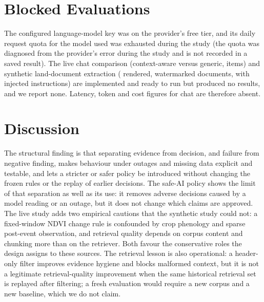\documentclass[journal]{IEEEtran}
\begin{document}
\section{Blocked Evaluations}\label{sec:blocked}
The configured language-model key was on the provider's free tier, and its daily request quota for the model used was exhausted during the study (the quota was diagnosed from the provider's error during the study and is not recorded in a saved result). The live chat comparison (context-aware versus generic, \ChatLiveItems{} items) and synthetic land-document extraction (\LandDocsSynthetic{} rendered, watermarked documents, \LandDocsInjected{} with injected instructions) are implemented and ready to run but produced no results, and we report none. Latency, token and cost figures for chat are therefore absent.

\section{Discussion}
The structural finding is that separating evidence from decision, and failure from negative finding, makes behaviour under outages and missing data explicit and testable, and lets a stricter or safer policy be introduced without changing the frozen rules or the replay of earlier decisions. The safe-AI policy shows the limit of that separation as well as its use: it removes adverse decisions caused by a model reading or an outage, but it does not change which claims are approved. The live study adds two empirical cautions that the synthetic study could not: a fixed-window NDVI change rule is confounded by crop phenology and sparse post-event observation, and retrieval quality depends on corpus content and chunking more than on the retriever. Both favour the conservative roles the design assigns to these sources. The retrieval lesson is also operational: a header-only filter improves evidence hygiene and blocks malformed context, but it is not a legitimate retrieval-quality improvement when the same historical retrieval set is replayed after filtering; a fresh evaluation would require a new corpus and a new baseline, which we do not claim.
\end{document}
